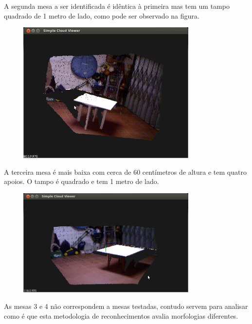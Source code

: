 A segunda mesa a ser identificada é idêntica à primeira mas tem um tampo quadrado de 1 metro de lado, como pode ser observado na figura.

\begin{figure}[htb]
\begin{center}
	\includegraphics[width=0.80\textwidth]{figures/mesa2.png}
	\label{fig:mesa2}
\end{center}
\end{figure}

A terceira mesa é mais baixa com cerca de 60 centímetros de altura e tem quatro apoios. O tampo é quadrado e tem 1 metro de lado.
\begin{figure}[htb]
\begin{center}
	\includegraphics[width=0.80\textwidth]{figures/mesa3.png}
	\label{fig:mesa3}
\end{center}
\end{figure}

As mesas 3 e 4 não correspondem a mesas testadas, contudo servem para analisar como é que esta metodologia de reconhecimentos avalia morfologias diferentes.

